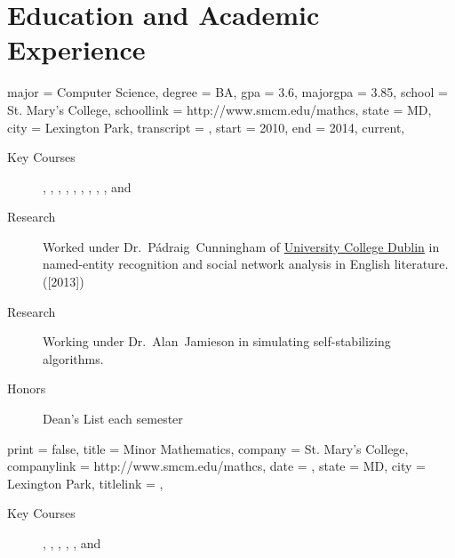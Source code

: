 \documentclass{simplecv}
\begin{document}
\section{Education and Academic Experience}
\begin{education}
  {
    major = Computer Science,
    degree = BA,
    gpa = 3.6,
    majorgpa = 3.85,
    school = St. Mary's College,
    schoollink = http://www.smcm.edu/mathcs,
    state = MD,
    city = Lexington Park,
    transcript = \transcript,
    start = 2010,
    end = 2014,
    current,
  }

\begin{description}
\item[Key Courses]
  ,
  ,
  ,
  ,
  ,
  ,
  ,
  ,
  ,
  and
\item[Research] Worked under
  Dr.~P\'adraig~Cunningham of \href{http://www.ucd.ie}{University
    College Dublin} in named-entity recognition and social network
  analysis in English literature. ([2013])
\item[Research] Working under Dr.~Alan~Jamieson in simulating
  self-stabilizing algorithms.
\item[Honors] Dean's List each semester
\end{description}
\end{education}

\begin{position}
  {
    print   = false,
    title   = Minor \Dash Mathematics,
    company = St. Mary's College,
    companylink = http://www.smcm.edu/mathcs,
    date    = ,
    state   = MD,
    city    = Lexington Park,
    titlelink = \transcript,
  }

  \begin{description}
  \item[Key Courses]
    ,
    ,
    ,
    ,
    ,
    and
  \end{description}
\end{position}
\end{document}
